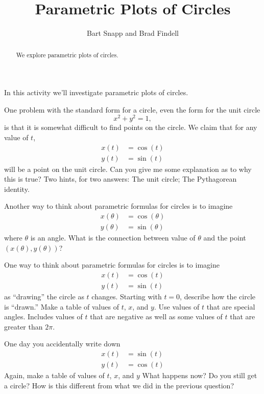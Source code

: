\documentclass{ximera}
\title{Parametric Plots of Circles}
\author{Bart Snapp and Brad Findell}
\begin{document}
\begin{abstract}
We explore parametric plots of circles. 
\end{abstract}
\maketitle

In this activity we'll investigate parametric plots of circles.


\begin{problem} 
One problem with the standard form for a circle, even the form for the unit circle
\[
x^2 + y^2 = 1,
\]
is that it is somewhat difficult to find points on the circle. We
claim that for any value of $t$,
\begin{align*}
x(t) &= \cos(t)\\
y(t) &= \sin(t) 
\end{align*}
will be a point on the unit circle. Can you give me some explanation
as to why this is true? Two hints, for two answers: The unit circle;
The Pythagorean identity.
\vfill
\end{problem} 

\begin{problem}
Another way to think about parametric formulas for circles is to imagine 
\begin{align*}
x(\theta) &= \cos(\theta)\\
y(\theta) &= \sin(\theta) 
\end{align*}
where $\theta$ is an angle. What is the connection between value of
$\theta$ and the point $(x(\theta), y(\theta))$?
\vfill
\end{problem}

\newpage

\begin{problem}
One way to think about parametric formulas for circles is to imagine 
\begin{align*}
x(t) &= \cos(t)\\
y(t) &= \sin(t) 
\end{align*}
as ``drawing'' the circle as $t$ changes. Starting with $t=0$,
describe how the circle is ``drawn.''  Make a table of values of $t$, $x$, and $y$.  Use values of $t$ that are special angles.  Includes values of $t$ that are negative as well as some values of $t$ that are greater than $2\pi$.  
\vfill
\end{problem}

\begin{problem}
One day you accidentally write down
\begin{align*}
x(t) &= \sin(t)\\
y(t) &= \cos(t) 
\end{align*}
Again, make a table of values of $t$, $x$, and $y$
What happens now? Do you still get a circle? How is this different
from what we did in the previous question?
\vfill
\end{problem}
\end{document}
